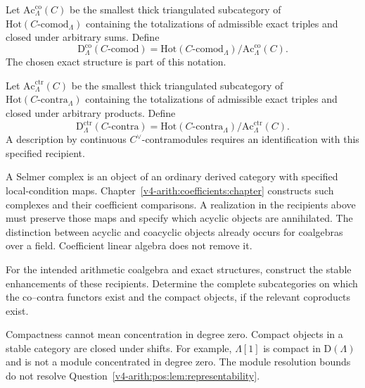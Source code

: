 \begin{definition}
\label{v4-arith:pos:def:co-derived}
Let \(\mathrm{Ac}^{\mathrm{co}}_\Lambda(C)\) be the smallest
thick triangulated subcategory of
\(\mathrm{Hot}(C\text{-comod}_\Lambda)\) containing the
totalizations of admissible exact triples and closed under
arbitrary sums. Define
\[
 \mathrm D^{\mathrm{co}}_\Lambda(C\text{-comod})
 =\mathrm{Hot}(C\text{-comod}_\Lambda)
       /\mathrm{Ac}^{\mathrm{co}}_\Lambda(C).
\]
The chosen exact structure is part of this notation.
\end{definition}

\begin{definition}
\label{v4-arith:pos:def:contra-derived}
Let \(\mathrm{Ac}^{\mathrm{ctr}}_\Lambda(C)\) be the smallest
thick triangulated subcategory of
\(\mathrm{Hot}(C\text{-contra}_\Lambda)\) containing the
totalizations of admissible exact triples and closed under
arbitrary products. Define
\[
 \mathrm D^{\mathrm{ctr}}_\Lambda(C\text{-contra})
 =\mathrm{Hot}(C\text{-contra}_\Lambda)
       /\mathrm{Ac}^{\mathrm{ctr}}_\Lambda(C).
\]
A description by continuous \(C^\vee\)-contramodules requires
an identification with this specified recipient.
\end{definition}

\begin{remark}
\label{v4-arith:pos:rem:nekovar}
A Selmer complex is an object of an ordinary derived category
with specified local-condition maps.
Chapter~\ref{v4-arith:coefficients:chapter} constructs such
complexes and their coefficient comparisons.
A realization in the recipients above must preserve those maps
and specify which acyclic objects are annihilated.
The distinction between acyclic and coacyclic objects already
occurs for coalgebras over a field. Coefficient linear algebra
does not remove it.
\end{remark}

\begin{question}
\label{v4-arith:pos:lem:representability}
For the intended arithmetic coalgebra and exact structures,
construct the stable enhancements of these recipients.
Determine the complete subcategories on which the co--contra
functors exist and the compact objects, if the relevant
coproducts exist.
\end{question}

Compactness cannot mean concentration in degree zero.
Compact objects in a stable category are closed under shifts.
For example, \(\Lambda[1]\) is compact in
\(\mathrm D(\Lambda)\) and is not a module concentrated in
degree zero. The module resolution bounds do not resolve
Question~\ref{v4-arith:pos:lem:representability}.

